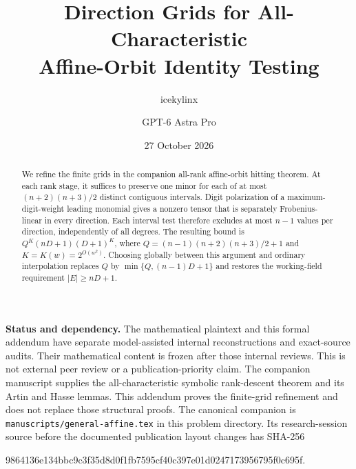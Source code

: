 
\usepackage{mathtools}
\newtheorem{theorem}{Theorem}[section]
\newtheorem{lemma}[theorem]{Lemma}
\newtheorem{corollary}[theorem]{Corollary}
\newcommand{\F}{\mathbb F}
\newcommand{\SV}{\operatorname{SV}}
\newcommand{\wt}{\operatorname{wt}}
\newcommand{\pdeg}{\operatorname{pdeg}}
\title{Direction Grids for All-Characteristic\\
Affine-Orbit Identity Testing}
\author{icekylinx \and GPT-6 Astra Pro}
\date{27 October 2026}
\maketitle

\begin{abstract}
We refine the finite grids in the companion all-rank affine-orbit
hitting theorem. At each rank stage, it suffices to preserve one minor
for each of at most $(n+2)(n+3)/2$ distinct contiguous intervals.
Digit polarization of a maximum-digit-weight leading monomial gives
a nonzero tensor that is separately Frobenius-linear in every direction.
Each interval test therefore excludes at most $n-1$ values per direction,
independently of all degrees. The resulting bound is
$Q^{K}(nD+1)(D+1)^K$, where
$Q=(n-1)(n+2)(n+3)/2+1$ and $K=K(w)=2^{O(w^2)}$.
Choosing globally between this argument and ordinary interpolation
replaces $Q$ by $\min\{Q,(n-1)D+1\}$ and restores the working-field
requirement $|E|\ge nD+1$.
\end{abstract}

\noindent\textbf{Status and dependency.}
The mathematical plaintext and this formal addendum have separate
model-assisted internal reconstructions and exact-source audits.
Their mathematical content is frozen after those internal reviews.
This is not external peer review or a publication-priority claim.
The companion manuscript supplies the all-characteristic symbolic
rank-descent theorem and its Artin and Hasse lemmas. This addendum proves
the finite-grid refinement and does not replace those structural proofs.
The canonical companion is \texttt{manuscripts/general-affine.tex}
in this problem directory. Its research-session source before the
documented publication layout changes has SHA-256
\begin{center}\footnotesize\ttfamily
9864136e134bbc9c3f35d8d0f1fb7595cf40c397e01d0247173956795f0c695f.
\end{center}

